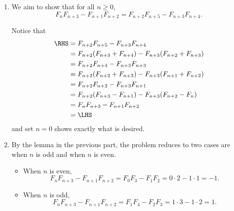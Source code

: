 \Question{\currfilebase}

\begin{enumerate}
    \item We aim to show that for all \(n \geq 0\),
          \[
              F_n F_{n + 3} - F_{n + 1} F_{n + 2} = F_{n + 2} F_{n + 5} - F_{n + 3} F_{n + 4}.
          \]

          Notice that
          \begin{align*}
              \RHS & = F_{n + 2} F_{n + 5} - F_{n + 3} F_{n + 4}                             \\
                   & = F_{n + 2} (F_{n + 3} + F_{n + 4}) - F_{n + 3} (F_{n + 2} + F_{n + 3}) \\
                   & = F_{n + 2} F_{n + 4} - F_{n + 3} F_{n + 3}                             \\
                   & = F_{n + 2} (F_{n + 2} + F_{n + 3}) - F_{n + 3} (F_{n + 1} + F_{n + 2}) \\
                   & = F_{n + 2} F_{n + 2} - F_{n + 3} F_{n + 1}                             \\
                   & = F_{n + 2} (F_{n + 3} - F_{n + 1}) - F_{n + 3} (F_{n + 2} - F_{n})     \\
                   & = F_{n} F_{n + 3} - F_{n + 1} F_{n + 2}                                 \\
                   & = \LHS
          \end{align*}
          and set \(n = 0\) shows exactly what is desired.

    \item By the lemma in the previous part, the problem reduces to two cases are when \(n\) is odd and when \(n\) is even.
          \begin{itemize}
              \item When \(n\) is even,
                    \[
                        F_{n} F_{n + 3} - F_{n + 1} F_{n + 2} = F_0 F_3 - F_1 F_2 = 0 \cdot 2- 1 \cdot 1 = -1.
                    \]

              \item When \(n\) is odd,
                    \[
                        F_{n} F_{n + 3} - F_{n + 1} F_{n + 2} = F_1 F_4 - F_2 F_3 = 1 \cdot 3 - 1 \cdot 2 = 1.
                    \]
          \end{itemize}


\end{enumerate}

